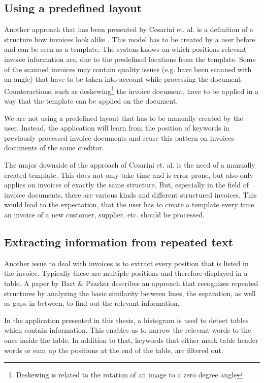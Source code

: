 \subsection{Using a predefined layout}
Another approach that has been presented by Cesarini et. al. is a definition of a structure how invoices look alike \cite{Cesarini98}. This model has to be created by a user before and can be seen as a template. The system knows on which positions relevant invoice information are, due to the predefined locations from the template.
Some of the scanned invoices may contain quality issues (e.g. have been scanned with an angle) that have to be taken into account while processing the document. Counteractions, such as deskewing\footnote{Deskewing is related to the rotation of an image to a zero degree angle} the invoice document, have to be applied in a way that the template can be applied on the document.

We are not using a predefined layout that has to be manually created by the user. Instead, the application will learn from the position of keywords in previously processed invoice documents and reuse this pattern on invoices documents of the same creditor.

The major downside of the approach of Cesarini et. al. \cite{Cesarini98} is the need of a manually created template. This does not only take time and is error-prone, but also only applies on invoices of exactly the same structure. But, especially in the field of invoice documents, there are various kinds and different structured invoices. This would lead to the expectation, that the user has to create a template every time an invoice of a new customer, supplier, etc. should be processed.

\subsection{Extracting information from repeated text}
Another issue to deal with invoices is to extract every position that is listed in the invoice. Typically these are multiple positions and therefore displayed in a table. A paper by Bart \& Psarker \cite{Bart10}  describes an approach that recognizes repeated structures by analyzing the basic similarity between lines, the separation, as well as gaps in between, to find out the relevant information.

In the application presented in this thesis, a histogram is used to detect tables which contain information. This enables us to narrow the relevant words to the ones inside the table. In addition to that, keywords that either mark table header words or sum up the positions at the end of the table, are filtered out.

